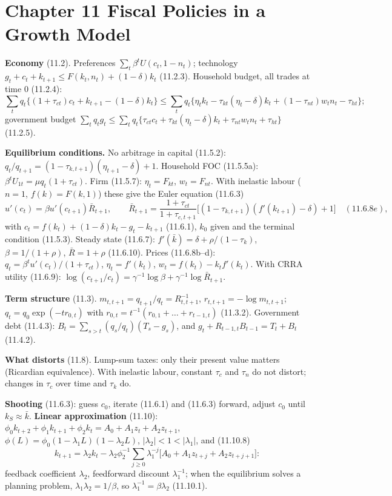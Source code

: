 \documentclass[12pt, letterpaper]{article}
\newcommand{\Rb}{\bar R}
\newcommand{\kb}{\bar k}
\begin{document}
\tableofcontents
\newpage

\section{Chapter 11 \quad Fiscal Policies in a Growth Model}

\begin{tcolorbox}[theorybox,title={Chapter 11 Overview}]
\textbf{Economy} (11.2). Preferences $\sum_t\beta^tU(c_t,1-n_t)$; technology $g_t+c_t+k_{t+1}\le F(k_t,n_t)+(1-\delta)k_t$
(11.2.3). Household budget, all trades at time 0 (11.2.4):
\[
\sum_tq_t\{(1+\tau_{ct})c_t+k_{t+1}-(1-\delta)k_t\}\le\sum_tq_t\{\eta_tk_t-\tau_{kt}(\eta_t-\delta)k_t+(1-\tau_{nt})w_tn_t-\tau_{ht}\};
\]
government budget $\sum_tq_tg_t\le\sum_tq_t\{\tau_{ct}c_t+\tau_{kt}(\eta_t-\delta)k_t+\tau_{nt}w_tn_t+\tau_{ht}\}$ (11.2.5).

\textbf{Equilibrium conditions.} No arbitrage in capital (11.5.2): $q_t/q_{t+1}=(1-\tau_{k,t+1})(\eta_{t+1}-\delta)+1$.
Household FOC (11.5.5a): $\beta^tU_{1t}=\mu q_t(1+\tau_{ct})$. Firm (11.5.7): $\eta_t=F_{kt}$, $w_t=F_{nt}$. With inelastic
labour ($n=1$, $f(k)=F(k,1)$) these give the Euler equation (11.6.3)
\[
u'(c_t)=\beta u'(c_{t+1})\Rb_{t+1},\qquad
\Rb_{t+1}=\frac{1+\tau_{ct}}{1+\tau_{c,t+1}}\big[(1-\tau_{k,t+1})(f'(k_{t+1})-\delta)+1\big]\quad(11.6.8e),
\]
with $c_t=f(k_t)+(1-\delta)k_t-g_t-k_{t+1}$ (11.6.1), $k_0$ given and the terminal condition (11.5.3). Steady state
(11.6.7): $f'(\kb)=\delta+\rho/(1-\tau_k)$, $\beta=1/(1+\rho)$, $\Rb=1+\rho$ (11.6.10). Prices (11.6.8b--d):
$q_t=\beta^tu'(c_t)/(1+\tau_{ct})$, $\eta_t=f'(k_t)$, $w_t=f(k_t)-k_tf'(k_t)$. With CRRA utility (11.6.9):
$\log(c_{t+1}/c_t)=\gamma^{-1}\log\beta+\gamma^{-1}\log\Rb_{t+1}$.

\textbf{Term structure} (11.3). $m_{t,t+1}=q_{t+1}/q_t=R_{t,t+1}^{-1}$, $r_{t,t+1}=-\log m_{t,t+1}$;
$q_t=q_0\exp(-tr_{0,t})$ with $r_{0,t}=t^{-1}(r_{0,1}+\dots+r_{t-1,t})$ (11.3.2).
Government debt (11.4.3): $B_t=\sum_{s>t}(q_s/q_t)(T_s-g_s)$, and $g_t+R_{t-1,t}B_{t-1}=T_t+B_t$ (11.4.2).

\textbf{What distorts} (11.8). Lump-sum taxes: only their present value matters (Ricardian equivalence). With inelastic
labour, constant $\tau_c$ and $\tau_n$ do not distort; changes in $\tau_c$ over time and $\tau_k$ do.

\textbf{Shooting} (11.6.3): guess $c_0$, iterate (11.6.1) and (11.6.3) forward, adjust $c_0$ until $k_S\approx\kb$.
\textbf{Linear approximation} (11.10): $\phi_0k_{t+2}+\phi_1k_{t+1}+\phi_2k_t=A_0+A_1z_t+A_2z_{t+1}$,
$\phi(L)=\phi_0(1-\lambda_1L)(1-\lambda_2L)$, $|\lambda_2|<1<|\lambda_1|$, and (11.10.8)
\[
k_{t+1}=\lambda_2k_t-\lambda_2\phi_2^{-1}\sum_{j\ge0}\lambda_1^{-j}\big[A_0+A_1z_{t+j}+A_2z_{t+j+1}\big]:
\]
feedback coefficient $\lambda_2$, feedforward discount $\lambda_1^{-1}$; when the equilibrium solves a planning problem,
$\lambda_1\lambda_2=1/\beta$, so $\lambda_1^{-1}=\beta\lambda_2$ (11.10.1).


\end{tcolorbox}
\end{document}
